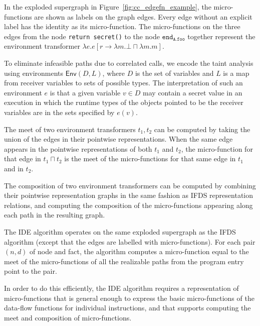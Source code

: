\begin{example}
    In the exploded supergraph in Figure~\ref{fig:cc_edgefn_example},
    the micro-functions are shown as labels on the graph edges.
    Every edge without an explicit label has the identity as its
    micro-function. The micro-functions on the three edges from
    the node \verb+return secret()+ to the node $\texttt{end}_\texttt{A.foo}$
    together represent the environment transformer 
    $\lambda e.e[r \to \lambda m.\bot \sqcap \lambda m.m]$.

    To eliminate infeasible paths due to correlated calls, we encode the taint
    analysis using environments $\textsf{Env}(D,L)$, where $D$ is the set of
    variables and $L$ is a map from receiver variables to sets of possible
    types. The interpretation of such an environment $e$ is that a given variable
    $v \in D$ may contain a secret value in an execution in which the runtime
    types of the objects pointed to be the receiver variables are in the sets
    specified by $e(v)$.
\end{example}

The meet of two environment transformers $t_1, t_2$ can be computed by taking the union of the edges
in their pointwise representations. When the same edge appears in the pointwise representations of
both $t_1$ and $t_2$, the micro-function for that edge in $t_1 \sqcap t_2$ is the meet of the
micro-functions for that same edge in $t_1$ and in $t_2$.

The composition of two environment transformers can be computed by combining their pointwise
representation graphs in the same fashion as IFDS representation relations, and 
computing the composition of the micro-functions appearing along each path in the resulting graph.

The IDE algorithm operates on the same exploded supergraph as the IFDS algorithm
(except that the edges are labelled with micro-functions). For each pair $(n,d)$ of
node and fact, the algorithm computes a micro-function equal to the meet of the micro-functions
of all the realizable paths from the program entry point to the pair.

In order to do this efficiently, the IDE algorithm requires a representation of micro-functions
that is general enough to express the basic micro-functions of the data-flow functions for individual
instructions, and that supports computing the meet and composition of micro-functions.

